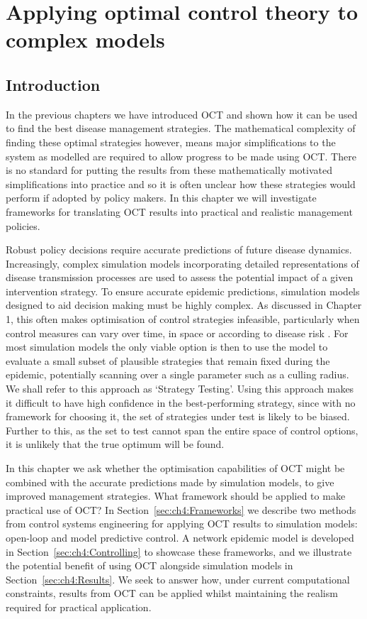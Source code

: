 %
\chapter{Applying optimal control theory to complex models}
\label{ch:apply_to_complex}

\section{Introduction}
\label{sec:ch4:Intro}

In the previous chapters we have introduced OCT and shown how it can be used to find the best disease management strategies. The mathematical complexity of finding these optimal strategies however, means major simplifications to the system as modelled are required to allow progress to be made using OCT. There is no standard for putting the results from these mathematically motivated simplifications into practice and so it is often unclear how these strategies would perform if adopted by policy makers. In this chapter we will investigate frameworks for translating OCT results into practical and realistic management policies.

Robust policy decisions require accurate predictions of future disease dynamics. Increasingly, complex simulation models incorporating detailed representations of disease transmission processes are used to assess the potential impact of a given intervention strategy. To ensure accurate epidemic predictions, simulation models designed to aid decision making must be highly complex. As discussed in Chapter 1, this often makes optimisation of control strategies infeasible, particularly when control measures can vary over time, in space or according to disease risk \citep{bellman_dynamic_2013}. For most simulation models the only viable option is then to use the model to evaluate a small subset of plausible strategies that remain fixed during the epidemic, potentially scanning over a single parameter such as a culling radius. We shall refer to this approach as `Strategy Testing'. Using this approach makes it difficult to have high confidence in the best-performing strategy, since with no framework for choosing it, the set of strategies under test is likely to be biased. Further to this, as the set to test cannot span the entire space of control options, it is unlikely that the true optimum will be found.

In this chapter we ask whether the optimisation capabilities of OCT might be combined with the accurate predictions made by simulation models, to give improved management strategies. What framework should be applied to make practical use of OCT? In Section~\ref{sec:ch4:Frameworks} we describe two methods from control systems engineering for applying OCT results to simulation models: open-loop and model predictive control. A network epidemic model is developed in Section~\ref{sec:ch4:Controlling} to showcase these frameworks, and we illustrate the potential benefit of using OCT alongside simulation models in Section~\ref{sec:ch4:Results}. We seek to answer how, under current computational constraints, results from OCT can be applied whilst maintaining the realism required for practical application.

